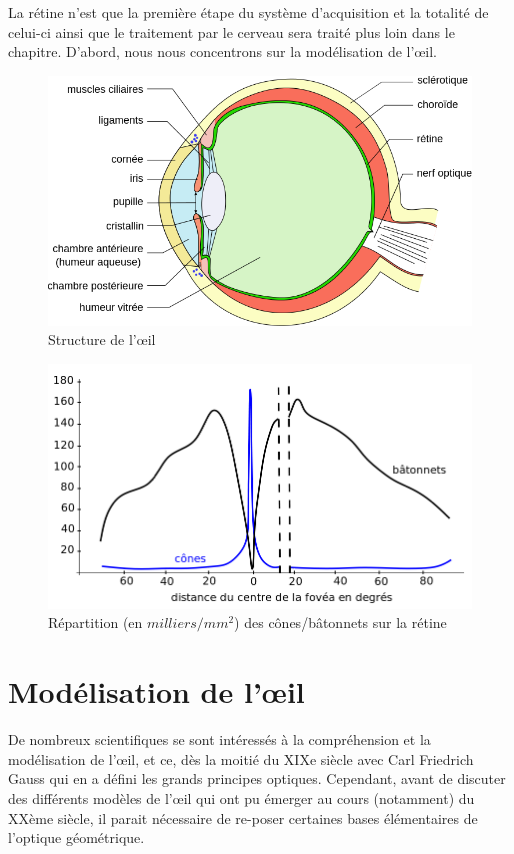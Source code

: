 	\par La rétine n'est que la première étape du système d'acquisition et la totalité de celui-ci ainsi que le traitement par le cerveau sera traité plus loin dans le chapitre. D'abord, nous nous concentrons sur la modélisation de l'œil.
	
	\begin{figure}
		\centering
		\includegraphics[scale=.4]{Figures/SchemaOeil}
		\caption{Structure de l'œil}
		\label{fig:oeil}
	\end{figure}
	
	\begin{figure}
		\centering
		\includegraphics[scale=.5]{Figures/DensiteConesBatonnets}
		\caption{Répartition (en $milliers/mm^2$) des cônes/bâtonnets sur la rétine}
		\label{fig:densite_cones_batonnets}
	\end{figure}
	
	\section{Modélisation de l'œil}
	\par De nombreux scientifiques se sont intéressés à la compréhension et la modélisation de l'œil, et ce, dès la moitié du XIXe siècle avec Carl Friedrich Gauss qui en a défini les grands principes optiques. Cependant, avant de discuter des différents modèles de l'œil qui ont pu émerger au cours (notamment) du XXème siècle, il parait nécessaire de re-poser certaines bases élémentaires de l'optique géométrique.
	
